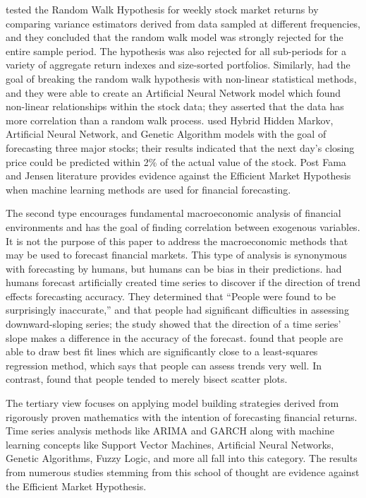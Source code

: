 \documentclass{ncjms}
\begin{document}
	\citet{Lo:1988} tested the Random Walk Hypothesis for weekly stock market returns by comparing variance estimators derived from data sampled at different frequencies, and they concluded that the random walk model was strongly rejected for the entire sample period.
	The hypothesis was also rejected for all sub-periods for a variety of aggregate return indexes and size-sorted portfolios.
	Similarly, \citet{Lendasse:2000} had the goal of breaking the random walk hypothesis with non-linear statistical methods, and they were able to create an Artificial Neural Network model which found non-linear relationships within the stock data; they asserted that the data has more correlation than a random walk process.
	\citet{Hassan:2007} used Hybrid Hidden Markov, Artificial Neural Network, and Genetic Algorithm models with the goal of forecasting three major stocks; their results indicated that the next day’s closing price could be predicted within 2\% of the actual value of the stock.
	Post Fama and Jensen literature provides evidence against the Efficient Market Hypothesis when machine learning methods are used for financial forecasting.

	The second type encourages fundamental macroeconomic analysis of financial environments and has the goal of finding correlation between exogenous variables.
	It is not the purpose of this paper to address the macroeconomic methods that may be used to forecast financial markets.
	This type of analysis is synonymous with forecasting by humans, but humans can be bias in their predictions.
	\citet{OConnor:1997} had humans forecast artificially created time series to discover if the direction of trend effects forecasting accuracy.
	They determined that ``People were found to be surprisingly inaccurate,'' and that people had significant difficulties in assessing downward-sloping series; the study showed that the direction of a time series' slope makes a difference in the accuracy of the forecast.
	\citet{Hoaglin:2006} found that people are able to draw best fit lines which are significantly close to a least-squares regression method, which says that people can assess trends very well.
	In contrast, \citet{Collyer:1990} found that people tended to merely bisect scatter plots.

	The tertiary view focuses on applying model building strategies derived from rigorously proven mathematics with the intention of forecasting financial returns.
	Time series analysis methods like ARIMA and GARCH along with machine learning concepts like Support Vector Machines, Artificial Neural Networks, Genetic Algorithms, Fuzzy Logic, and more all fall into this category.
	The results from numerous studies stemming from this school of thought are evidence against the Efficient Market Hypothesis.
\end{document}

